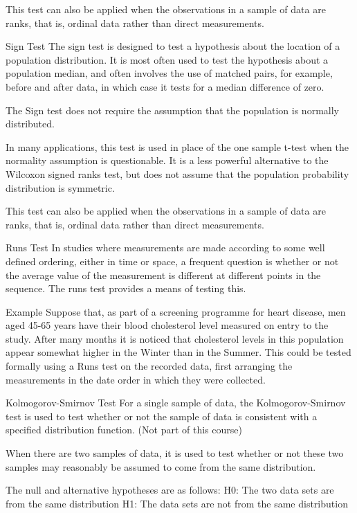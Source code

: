 This test can also be applied when the observations in a sample of data are ranks, that is, ordinal data rather than direct measurements.

 

Sign Test
The sign test is designed to test a hypothesis about the location of a population distribution. It is most often used to test the hypothesis about a population median, and often involves the use of matched pairs, for example, before and after data, in which case it tests for a median difference of zero.

The Sign test does not require the assumption that the population is normally distributed.

In many applications, this test is used in place of the one sample t-test when the normality assumption is questionable. It is a less powerful alternative to the Wilcoxon signed ranks test, but does not assume that the population probability distribution is symmetric.

This test can also be applied when the observations in a sample of data are ranks, that is, ordinal data rather than direct measurements.

Runs Test
In studies where measurements are made according to some well defined ordering, either in time or space, a frequent question is whether or not the average value of the measurement is different at different points in the sequence. The runs test provides a means of testing this.

Example 
Suppose that, as part of a screening programme for heart disease, men aged 45-65 years have their blood cholesterol level measured on entry to the study. After many months it is noticed that cholesterol levels in this population appear somewhat higher in the Winter than in the Summer. This could be tested formally using a Runs test on the recorded data, first arranging the measurements in the date order in which they were collected.

 Kolmogorov-Smirnov Test
For a single sample of data, the Kolmogorov-Smirnov test is used to test whether or not the sample of data is consistent with a specified distribution function.  (Not part of this course)

When there are two samples of data, it is used to test whether or not these two samples may reasonably be assumed to come from the same distribution. 

The null and alternative hypotheses are as follows:
H0: The two data sets are from the same distribution
H1: The data sets are not from the same distribution

